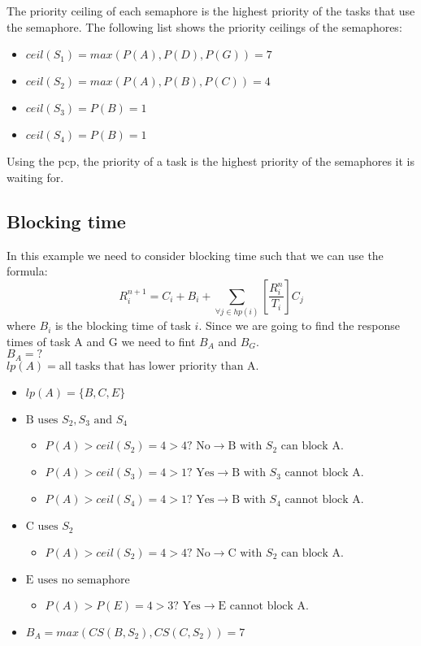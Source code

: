 The priority ceiling of each semaphore is the highest priority of the tasks that use the semaphore. The following list shows the priority ceilings of the semaphores:

\begin{itemize}
    \item $ceil(S_1) = max(P(A), P(D), P(G)) = 7$
    \item $ceil(S_2) = max(P(A), P(B), P(C)) = 4$
    \item $ceil(S_3) = P(B) = 1$
    \item $ceil(S_4) = P(B) = 1$
\end{itemize}

Using the \ac{pcp}, the priority of a task is the highest priority of the semaphores it is waiting for.

\subsection{\textbf{Blocking time}}
    In this example we need to consider blocking time such that we can use the formula:
    $$R_i^{n+1} = C_i + B_i + \sum\limits_{\forall j \in hp(i)} \left[\frac{R_i^n}{T_i}\right] C_j$$
    where $B_i$ is the blocking time of task $i$. Since we are going to find the response times of task A and G we need to fint $B_A$ and $B_G$. \\

    $B_A = ?$\\
    $lp(A) = \text{all tasks that has lower priority than A.}$

    \begin{itemize}
        \item $lp(A) = \{B, C, E\}$
        \item $\text{B uses } S_2, S_3 \text{ and } S_4$
        \begin{itemize}
            \item $P(A)>ceil(S_2) = 4>4? \text{ No} \rightarrow \text{B with } S_2 \text{ can block A.}$
            \item $P(A)>ceil(S_3) = 4>1? \text{ Yes} \rightarrow \text{B with } S_3 \text{ cannot block A.}$
            \item $P(A)>ceil(S_4) = 4>1? \text{ Yes} \rightarrow \text{B with } S_4 \text{ cannot block A.}$
        \end{itemize}
        \item $\text{C uses } S_2$
        \begin{itemize}
            \item $P(A)>ceil(S_2) = 4>4? \text{ No} \rightarrow \text{C with } S_2 \text{ can block A.}$
        \end{itemize}
        \item $\text{E uses no semaphore}$ 
        \begin{itemize}
            \item $P(A)>P(E) = 4>3? \text{ Yes} \rightarrow \text{E cannot block A.}$
        \end{itemize}
        \item $B_A = max(CS(B,S_2), CS(C,S_2)) = 7$\\
    \end{itemize}

